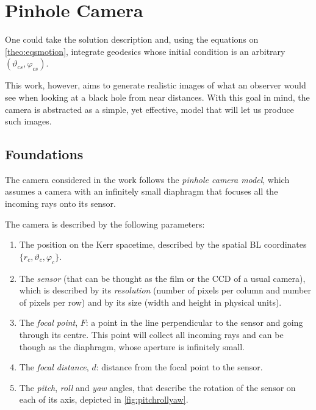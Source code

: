 \section{Pinhole Camera}
\label{sec:pinhole}

One could take the solution description and, using the equations on \autoref{theo:eqsmotion}, integrate geodesics whose initial condition is an arbitrary $(\vartheta_{cs}, \varphi_{cs})$.

This work, however, aims to generate realistic images of what an observer would see when looking at a black hole from near distances. With this goal in mind, the camera is abstracted as a simple, yet effective, model that will let us produce such images.

\subsection{Foundations}

The camera considered in the work follows the \emph{pinhole camera model}, which assumes a camera with an infinitely small diaphragm that focuses all the incoming rays onto its sensor.

The camera is described by the following parameters:
\begin{enumerate}
	\item The position on the Kerr spacetime, described by the spatial \ac{BL} coordinates $\{r_c, \vartheta_c, \varphi_c\}$.
	\item The \emph{sensor} (that can be thought as the film or the CCD of a usual camera), which is described by its \emph{resolution} (number of pixels per column and number of pixels per row) and by its size (width and height in physical units).
	\item The \emph{focal point}, $F$: a point in the line perpendicular to the sensor and going through its centre. This point will collect all incoming rays and can be though as the diaphragm, whose aperture is infinitely small.
	\item The \emph{focal distance}, $d$: distance from the focal point to the sensor.
	\item The \emph{pitch}, \emph{roll} and \emph{yaw} angles, that describe the rotation of the sensor on each of its axis, depicted in \autoref{fig:pitchrollyaw}.
\end{enumerate}

